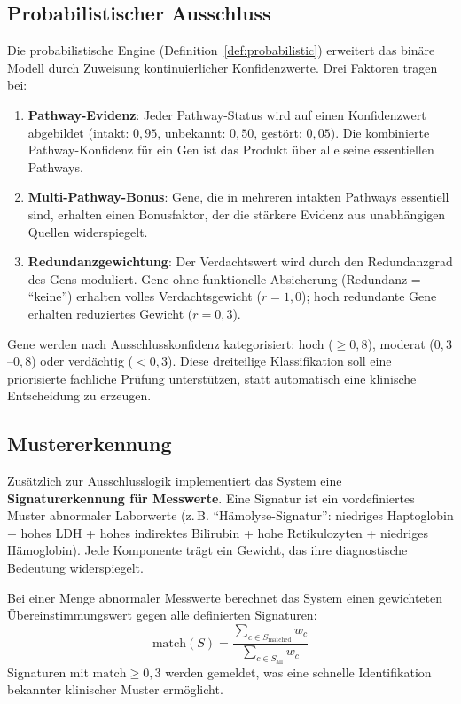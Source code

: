 \documentclass[12pt,a4paper]{article}
\begin{document}
\subsection{Probabilistischer Ausschluss}

Die probabilistische Engine (Definition~\ref{def:probabilistic}) erweitert das binäre Modell durch Zuweisung kontinuierlicher Konfidenzwerte. Drei Faktoren tragen bei:

\begin{enumerate}
    \item \textbf{Pathway-Evidenz}: Jeder Pathway-Status wird auf einen Konfidenzwert abgebildet (intakt: $0{,}95$, unbekannt: $0{,}50$, gestört: $0{,}05$). Die kombinierte Pathway-Konfidenz für ein Gen ist das Produkt über alle seine essentiellen Pathways.
    \item \textbf{Multi-Pathway-Bonus}: Gene, die in mehreren intakten Pathways essentiell sind, erhalten einen Bonusfaktor, der die stärkere Evidenz aus unabhängigen Quellen widerspiegelt.
    \item \textbf{Redundanzgewichtung}: Der Verdachtswert wird durch den Redundanzgrad des Gens moduliert. Gene ohne funktionelle Absicherung (Redundanz = "`keine"') erhalten volles Verdachtsgewicht ($r = 1{,}0$); hoch redundante Gene erhalten reduziertes Gewicht ($r = 0{,}3$).
\end{enumerate}

Gene werden nach Ausschlusskonfidenz kategorisiert: hoch ($\geq 0{,}8$), moderat ($0{,}3$--$0{,}8$) oder verdächtig ($< 0{,}3$). Diese dreiteilige Klassifikation soll eine priorisierte fachliche Prüfung unterstützen, statt automatisch eine klinische Entscheidung zu erzeugen.

\subsection{Mustererkennung}

Zusätzlich zur Ausschlusslogik implementiert das System eine \textbf{Signaturerkennung für Messwerte}. Eine Signatur ist ein vordefiniertes Muster abnormaler Laborwerte (z.\,B. "`Hämolyse-Signatur"': niedriges Haptoglobin + hohes LDH + hohes indirektes Bilirubin + hohe Retikulozyten + niedriges Hämoglobin). Jede Komponente trägt ein Gewicht, das ihre diagnostische Bedeutung widerspiegelt.

Bei einer Menge abnormaler Messwerte berechnet das System einen gewichteten Übereinstimmungswert gegen alle definierten Signaturen:
\begin{equation}
    \text{match}(S) = \frac{\sum_{c \in S_{\text{matched}}} w_c}{\sum_{c \in S_{\text{all}}} w_c}
\end{equation}
Signaturen mit $\text{match} \geq 0{,}3$ werden gemeldet, was eine schnelle Identifikation bekannter klinischer Muster ermöglicht.
\end{document}
